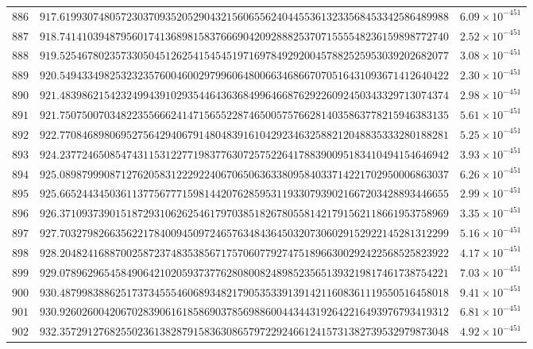 \documentclass[12pt,reqno]{amsart}
\theoremstyle{remark}
\begin{document}
\begin{longtable}{clc}
$886$ & $917.6199307480572303709352052904321560655624044553613233568453342586489988$ & $6.09\times 10^{-451}$ \\
$887$ & $918.7414103948795601741368981583766690420928882537071555548236159898772740$ & $2.52\times 10^{-451}$ \\
$888$ & $919.5254678023573305045126254154545197169784929200457882525953039202682077$ & $3.08\times 10^{-451}$ \\
$889$ & $920.5494334982532323576004600297996064800663468667070516431093671412640422$ & $2.30\times 10^{-451}$ \\
$890$ & $921.4839862154232499439102935446436368499646687629226092450343329713074374$ & $2.98\times 10^{-451}$ \\
$891$ & $921.7507500703482235566624147156552287465005757662814035863778215946383135$ & $5.61\times 10^{-451}$ \\
$892$ & $922.7708468980695275642940679148048391610429234632588212048835333280188281$ & $5.25\times 10^{-451}$ \\
$893$ & $924.2377246508547431153122771983776307257522641788390095183410494154646942$ & $3.93\times 10^{-451}$ \\
$894$ & $925.0898799908712762058312229224067065063633809584033714221702950006863037$ & $6.26\times 10^{-451}$ \\
$895$ & $925.6652443450361137756777159814420762859531193307939021667203428893446655$ & $2.99\times 10^{-451}$ \\
$896$ & $926.3710937390151872931062625461797038518267805581421791562118661953758969$ & $3.35\times 10^{-451}$ \\
$897$ & $927.7032798266356221784009450972465763484364503207306029152922145281312299$ & $5.16\times 10^{-451}$ \\
$898$ & $928.2048241688700258723748353856717570607792747518966300292422568525823922$ & $4.17\times 10^{-451}$ \\
$899$ & $929.0789629654584906421020593737762808008248985235651393219817461738754221$ & $7.03\times 10^{-451}$ \\
$900$ & $930.4879983886251737345554606893482179053533913914211608361119550516458018$ & $9.41\times 10^{-451}$ \\
$901$ & $930.9260260042067028390616185869037856988600443443192642216493976793419312$ & $6.81\times 10^{-451}$ \\
$902$ & $932.3572912768255023613828791583630865797229246612415731382739532979873048$ & $4.92\times 10^{-451}$ \\

\end{longtable}
\end{document}
